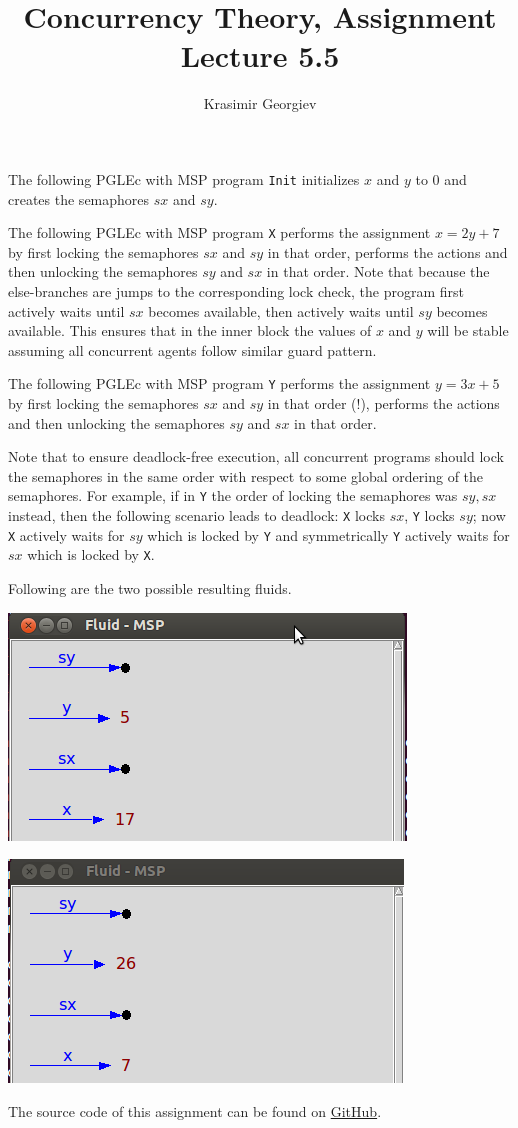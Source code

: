 \documentclass[a4paper]{article}
\title{Concurrency Theory, Assignment Lecture 5.5}
\author{Krasimir Georgiev}
\newcommand{\prog}[1]{\texttt{#1}}
\begin{document}
\maketitle

The following PGLEc with MSP program \prog{Init} initializes $x$ and $y$ to 0
and creates the semaphores $sx$ and $sy$.


The following PGLEc with MSP program \prog{X} performs the assignment
$x = 2y + 7$ by first locking the semaphores $sx$ and $sy$ in that order,
performs the actions and then unlocking the semaphores $sy$ and $sx$ in that
order. Note that because the else-branches are jumps to the corresponding lock
check, the program first actively waits until $sx$ becomes available, then
actively waits until $sy$ becomes available. This ensures that in the inner
block the values of $x$ and $y$ will be stable assuming all concurrent agents
follow similar guard pattern.


The following PGLEc with MSP program \prog{Y} performs the assignment $y = 3x +
5$ by first locking the semaphores $sx$ and $sy$ in that order (!), performs
the actions and then unlocking the semaphores $sy$ and $sx$ in that order.


Note that to ensure deadlock-free execution, all concurrent programs should
lock the semaphores in the same order with respect to some global ordering of
the semaphores. For example, if in \prog{Y} the order of locking the semaphores
was $sy, sx$ instead, then the following scenario leads to deadlock: \prog{X}
locks $sx$, \prog{Y} locks $sy$; now \prog{X} actively waits for $sy$ which is
locked by \prog{Y} and symmetrically \prog{Y} actively waits for $sx$ which is
locked by \prog{X}.

Following are the two possible resulting fluids.

\includegraphics{fluid-1.png}

\includegraphics{fluid-2.png}

The source code of this assignment can be found on
\href{https://github.com/comco/concurrency-theory-assignments/tree/master/assignment-lecture-5.5}{GitHub}.
\end{document}
